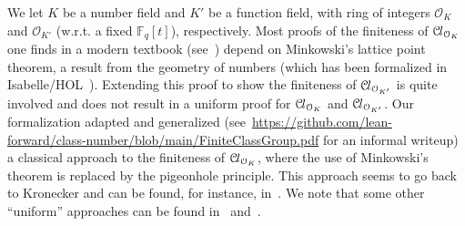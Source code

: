 \documentclass[a4paper,USenglish,cleveref, autoref, thm-restate]{lipics-v2021}
\newcommand*{\OK}[1][K]{\mathcal{O}_{#1}}
\newcommand*{\Cl}{\mathcal{C}\kern-.075em l}
\newcommand*{\Fq}[1][q]{\mathbb{F}_{#1}}
\newcommand{\mathlib}{\textsf{mathlib}\xspace}
\begin{document}
We let $K$ be a number field and $K'$ be a function field, with ring of integers $\OK$ and $\OK[K']$ (w.r.t. a fixed $\Fq[q][t]$), respectively. 
Most proofs of the finiteness of $\Cl_{\OK}$ one finds in a modern textbook (see~\cite[Theorems 4.4,~5.3,~6.3]{Neukirch}) depend on Minkowski's lattice point theorem, a result from the geometry of numbers (which has been formalized in Isabelle/HOL~\cite{Minkowskis_Theorem-AFP}).
Extending this proof to show the finiteness of $\Cl_{\OK[K']}$ is quite involved and does not result in a uniform proof for $\Cl_{\OK}$ and $\Cl_{\OK[K']}$.
Our formalization adapted and generalized (see~\url{https://github.com/lean-forward/class-number/blob/main/FiniteClassGroup.pdf} for an informal writeup) a classical approach to the finiteness of $\Cl_{\OK}$, where the use of Minkowski's theorem is replaced by the pigeonhole principle. This approach seems to go back to Kronecker
and can be found, for instance, in~\cite{Ireland-Rosen}.
We note that some other ``uniform'' approaches can be found in~\cite{Artin-Whaples} and~\cite{Stasinski}.
\end{document}
